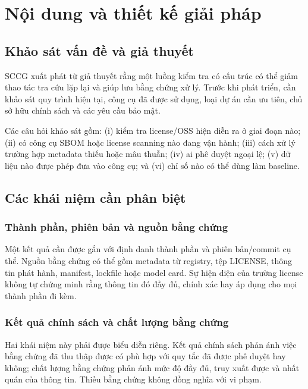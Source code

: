 \chapter{Nội dung và thiết kế giải pháp}

\section{Khảo sát vấn đề và giả thuyết}
SCCG xuất phát từ giả thuyết rằng một luồng kiểm tra có cấu trúc có thể giảm thao tác tra cứu lặp lại và giúp lưu bằng chứng xử lý. Trước khi phát triển, cần khảo sát quy trình hiện tại, công cụ đã được sử dụng, loại dự án cần ưu tiên, chủ sở hữu chính sách và các yêu cầu bảo mật.

Các câu hỏi khảo sát gồm: (i) kiểm tra license/OSS hiện diễn ra ở giai đoạn nào; (ii) có công cụ SBOM hoặc license scanning nào đang vận hành; (iii) cách xử lý trường hợp metadata thiếu hoặc mâu thuẫn; (iv) ai phê duyệt ngoại lệ; (v) dữ liệu nào được phép đưa vào công cụ; và (vi) chỉ số nào có thể dùng làm baseline.

\section{Các khái niệm cần phân biệt}
\subsection{Thành phần, phiên bản và nguồn bằng chứng}
Một kết quả cần được gắn với định danh thành phần và phiên bản/commit cụ thể. Nguồn bằng chứng có thể gồm metadata từ registry, tệp LICENSE, thông tin phát hành, manifest, lockfile hoặc model card. Sự hiện diện của trường license không tự chứng minh rằng thông tin đó đầy đủ, chính xác hay áp dụng cho mọi thành phần đi kèm.

\subsection{Kết quả chính sách và chất lượng bằng chứng}
Hai khái niệm này phải được biểu diễn riêng. Kết quả chính sách phản ánh việc bằng chứng đã thu thập được có phù hợp với quy tắc đã được phê duyệt hay không; chất lượng bằng chứng phản ánh mức độ đầy đủ, truy xuất được và nhất quán của thông tin. Thiếu bằng chứng không đồng nghĩa với vi phạm.

